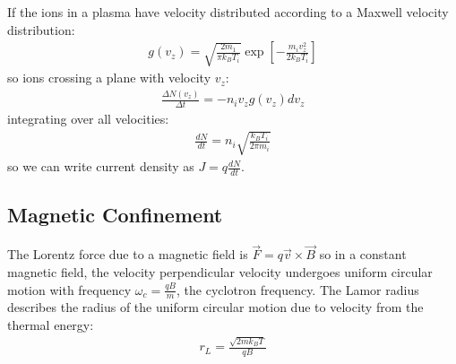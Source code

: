 \documentclass{article}
\numberwithin{equation}{section}
\begin{document}
If the ions in a plasma have velocity distributed according to a Maxwell velocity distribution:
\begin{align}
g(v_z) = \sqrt{\frac{2 m_1}{\pi k_B T_i}} \exp \left[ -\frac{m_i v_z^2}{2 k_B T_i} \right]
\end{align}
so ions crossing a plane with velocity $v_z$:
\begin{align}
\frac{\Delta N(v_z)}{\Delta t} = - n_i v_z g(v_z) d v_z
\end{align}
integrating over all velocities:
\begin{align}
\frac{d N}{dt} = n_i  \sqrt{\frac{k_B T_i}{2 \pi m_i}}
\end{align}
so we can write current density as $J = q \frac{dN}{dt}$.

\subsection{ Magnetic Confinement }

The Lorentz force due to a magnetic field is $\vec{F} = q \vec{v} \times \vec{B}$ so in a constant magnetic field, the velocity perpendicular velocity undergoes uniform circular motion with frequency $\omega_c = \frac{qB}{m}$, the cyclotron frequency. The Lamor radius describes the radius of the uniform circular motion due to velocity from the thermal energy:
\begin{align}
r_L = \frac{\sqrt{2m k_B T}}{qB}
\end{align}
\end{document}
